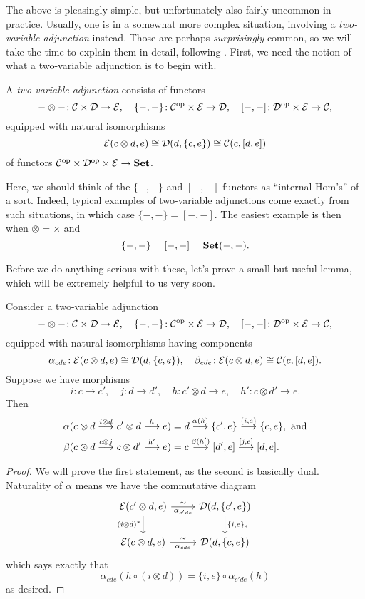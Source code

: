 The above is pleasingly simple, but unfortunately also fairly uncommon in practice. Usually, one is in a somewhat more complex situation, involving a \emph{two-variable adjunction}
instead. Those are perhaps \emph{surprisingly} common, so we will take the time to explain them in detail, following \cite{riehl-categorical-homotopy-theory}. First, we need the notion of what a two-variable
adjunction is to begin with.
\begin{definition}
	A \emph{two-variable adjunction} consists of functors
	\[ -\otimes-\!: \mathcal{C}\times\mathcal{D}\to\mathcal{E},\quad \{-,-\}\!:\mathcal{C}^{\mathrm{op}}\times\mathcal{E}\to\mathcal{D},\quad [-,-]\!:\mathcal{D}^{\mathrm{op}}\times\mathcal{E}\to\mathcal{C}, \]
	equipped with natural isomorphisms
	\[ \mathcal{E}(c\otimes d, e) \cong \mathcal{D}(d, \{c,e\}) \cong \mathcal{C}(c,[d,e]) \]
	of functors \(\mathcal{C}^{\mathrm{op}}\times\mathcal{D}^{\mathrm{op}}\times\mathcal{E}\to\mathbf{Set}\).
\end{definition}
\begin{remark}
	Here, we should think of the \(\{-,-\}\) and \([-,-]\) functors as ``internal Hom's'' of a sort. Indeed, typical examples of two-variable adjunctions come
	exactly from such situations, in which case \(\{-,-\} = [-,-]\). The easiest example is then when \(\otimes = \times\) and
	\[ \{-,-\} = [-,-] = \mathbf{Set}(-,-). \]
\end{remark}

Before we do anything serious with these, let's prove a small but useful lemma, which will be extremely helpful to us very soon.

\begin{lemma}\label{lemma:two-variable-adjunction-transposition-formula}
	Consider a two-variable adjunction
	\[ -\otimes-\!: \mathcal{C}\times\mathcal{D}\to\mathcal{E},\quad \{-,-\}\!:\mathcal{C}^{\mathrm{op}}\times\mathcal{E}\to\mathcal{D},\quad [-,-]\!:\mathcal{D}^{\mathrm{op}}\times\mathcal{E}\to\mathcal{C}, \]
	equipped with natural isomorphisms having components
	\[ \alpha_{cde}\!: \mathcal{E}(c\otimes d, e) \cong \mathcal{D}(d, \{c,e\}),\quad \beta_{cde}\!: \mathcal{E}(c\otimes d, e) \cong \mathcal{C}(c,[d,e]). \]
	Suppose we have morphisms
	\[ i\!:c\to c', \quad j\!:d\to d',\quad h\!:c'\otimes d \to e,\quad h'\!: c\otimes d'\to e. \]
	Then
	\begin{align*}
		\alpha( c\otimes d \overset{i\otimes d}{\longrightarrow} c'\otimes d \overset{h}{\longrightarrow} e ) &= d \overset{\alpha(h)}{\longrightarrow} \{c',e\} \overset{ \{i,e\} }{\longrightarrow} \{c,e\},\text{ and} \\
		\beta( c\otimes d \overset{c\otimes j}{\longrightarrow} c\otimes d' \overset{h'}{\longrightarrow} e ) &= c \overset{\beta(h')}{\longrightarrow} [d',e] \overset{[j,e]}{\longrightarrow} [d,e].
	\end{align*}
\end{lemma}
\begin{proof}
We will prove the first statement, as the second is basically dual. Naturality of \(\alpha\) means we have the commutative diagram
\[
	\begin{tikzcd}
		\calE(c'\otimes d,e)\ar[d,"{(i\otimes d)^*}"'] \ar[r,"\sim","\alpha_{c'de}"'] & \calD(d,\{c',e\})\ar[d,"{\{i,e\}_*}"] \\
		\calE(c\otimes d,e)\ar[r,"\sim","\alpha_{cde}"'] & \calD(d,\{c,e\})
	\end{tikzcd}
\]
which says exactly that
\[ \alpha_{cde}(h\circ (i\otimes d)) = \{i,e\}\circ\alpha_{c'de}(h) \]
as desired.
\end{proof}

